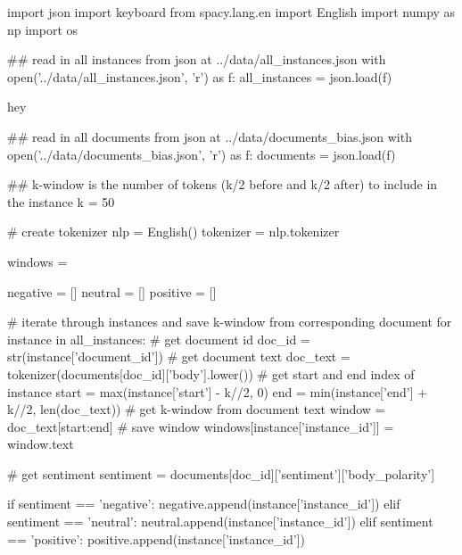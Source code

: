 
\begin{pyin}
import json
import keyboard
from spacy.lang.en import English
import numpy as np
import os
\end{pyin}


\begin{pyin}
\## read in all instances from json at ../data/all_instances.json
with open('../data/all_instances.json', 'r') as f:
    all_instances = json.load(f)
\end{pyin}

\begin{pyprint}
hey
\end{pyprint}


\begin{pyin}
\## read in all documents from json at ../data/documents_bias.json
with open('../data/documents_bias.json', 'r') as f:
    documents = json.load(f)
\end{pyin}


\begin{pyin}
\## k-window is the number of tokens (k/2 before and k/2 after) to include in the instance
k = 50

# create tokenizer
nlp = English()
tokenizer = nlp.tokenizer

windows = {}

negative = []
neutral = []
positive = []

# iterate through instances and save k-window from corresponding document
for instance in all_instances:
    # get document id
    doc_id = str(instance['document_id'])
    # get document text
    doc_text = tokenizer(documents[doc_id]['body'].lower())
    # get start and end index of instance
    start = max(instance['start'] - k//2, 0)
    end = min(instance['end'] + k//2, len(doc_text))
    # get k-window from document text
    window = doc_text[start:end]
    # save window
    windows[instance['instance_id']] = window.text

    # get sentiment
    sentiment = documents[doc_id]['sentiment']['body_polarity']

    if sentiment == 'negative':
        negative.append(instance['instance_id'])
    elif sentiment == 'neutral':
        neutral.append(instance['instance_id'])
    elif sentiment == 'positive':
        positive.append(instance['instance_id'])
\end{pyin}

